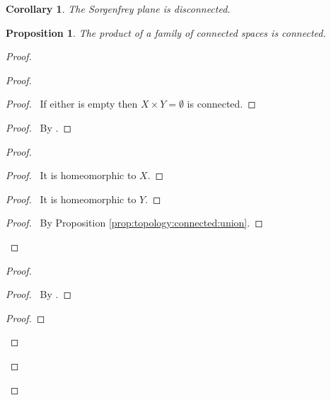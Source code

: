 \documentclass{report}
\newtheorem{prop}[lm]{Proposition}
\newtheorem{cor}{Corollary}[lm]
\theoremstyle{definition}
\begin{document}
  \begin{cor}
   The Sorgenfrey plane is disconnected.
  \end{cor}

  \begin{prop}
    \label{prop:topology:connected:product}
    The product of a family of connected spaces is connected.
  \end{prop}

  \begin{proof}
    \pf
    \begin{proof}
      \pf
      \begin{proof}
        \pf\ If either is empty then $X \times Y = \emptyset$ is connected.
      \end{proof}
      \begin{proof}
        \pf\ By .
      \end{proof}
      \begin{proof}
        \begin{proof}
          \pf\ It is homeomorphic to $X$.
        \end{proof}
        \begin{proof}
          \pf\ It is homeomorphic to $Y$.
        \end{proof}
        \qedstep
        \begin{proof}
          \pf\ By Proposition \ref{prop:topology:connected:union}.
        \end{proof}
      \end{proof}
      \qedstep
      \begin{proof}
        \begin{proof}
          \pf\ By .
        \end{proof}
        \qedstep
        \begin{proof}

\end{proof}
\end{proof}
\end{proof}
\end{proof}
\end{document}
